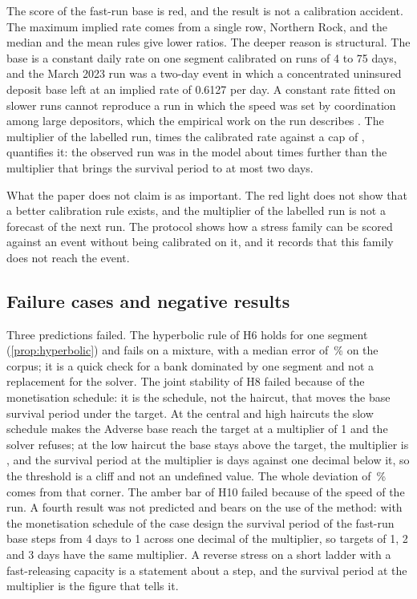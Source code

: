 The score of the fast-run base is red, and the result is not a calibration accident. The maximum implied rate comes from a single row, Northern Rock, and the median and the mean rules give lower ratios. The deeper reason is structural. The base is a constant daily rate on one segment calibrated on runs of 4 to 75 days, and the March 2023 run was a two-day event in which a concentrated uninsured deposit base left at an implied rate of 0.6127 per day. A constant rate fitted on slower runs cannot reproduce a run in which the speed was set by coordination among large depositors, which the empirical work on the run describes \citep{cipriani2024,iyerpuri2012}. The multiplier of the labelled run, \mSvb{} times the calibrated rate against a cap of \capFast{}, quantifies it: the observed run was in the model about \ratioLab{} times further than the multiplier that brings the survival period to at most two days.

What the paper does not claim is as important. The red light does not show that a better calibration rule exists, and the multiplier of the labelled run is not a forecast of the next run. The protocol shows how a stress family can be scored against an event without being calibrated on it, and it records that this family does not reach the event.

\subsection{Failure cases and negative results}

Three predictions failed. The hyperbolic rule of H6 holds for one segment (\cref{prop:hyperbolic}) and fails on a mixture, with a median error of \kHSixMed{}\,\% on the corpus; it is a quick check for a bank dominated by one segment and not a replacement for the solver. The joint stability of H8 failed because of the monetisation schedule: it is the schedule, not the haircut, that moves the base survival period under the target. At the central and high haircuts the slow schedule makes the Adverse base reach the target at a multiplier of 1 and the solver refuses; at the low haircut the base stays above the target, the multiplier is \lowSlowM{}, and the survival period at the multiplier is \lowSlowSp{} days against \lowSlowBelow{} one decimal below it, so the threshold is a cliff and not an undefined value. The whole deviation of \jointDevAdv{}\,\% comes from that corner. The amber bar of H10 failed because of the speed of the run. A fourth result was not predicted and bears on the use of the method: with the monetisation schedule of the case design the survival period of the fast-run base steps from 4 days to 1 across one decimal of the multiplier, so targets of 1, 2 and 3 days have the same multiplier. A reverse stress on a short ladder with a fast-releasing capacity is a statement about a step, and the survival period at the multiplier is the figure that tells it.

